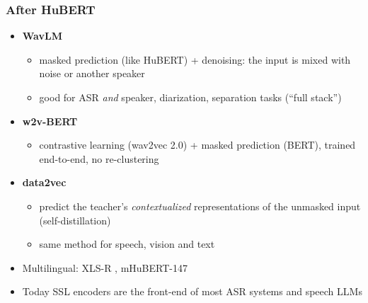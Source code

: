 \documentclass[table]{beamer}
\begin{document}
\begin{frame}
\frametitle{After HuBERT}
		\begin{itemize}
			\item \textbf{WavLM} \citep{chen2022wavlm}
			\begin{itemize}
				\item masked prediction (like HuBERT) + denoising: the input is mixed with noise or another speaker
				\item good for ASR \textit{and} speaker, diarization, separation tasks (``full stack'')
			\end{itemize}
			\item \textbf{w2v-BERT} \citep{chung2021w2vbert}
			\begin{itemize}
				\item contrastive learning (wav2vec 2.0) + masked prediction (BERT), trained end-to-end, no re-clustering
			\end{itemize}
			\item \textbf{data2vec} \citep{baevski2022data2vec}
			\begin{itemize}
				\item predict the teacher's \textit{contextualized} representations of the unmasked input (self-distillation)
				\item same method for speech, vision and text
			\end{itemize}
			\item Multilingual: XLS-R \citep{babu2021xlsr}, mHuBERT-147 \citep{zanonboito2024mhubert}
			\item Today SSL encoders are the front-end of most ASR systems and speech LLMs
		\end{itemize} 
\end{frame}


\end{document}
